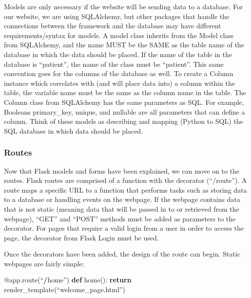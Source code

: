 \documentclass[]{book}
\newenvironment{Shaded}{\begin{snugshade}}{\end{snugshade}}
\newcommand{\KeywordTok}[1]{\textcolor[rgb]{0.13,0.29,0.53}{\textbf{#1}}}
\newcommand{\ControlFlowTok}[1]{\textcolor[rgb]{0.13,0.29,0.53}{\textbf{#1}}}
\newcommand{\OperatorTok}[1]{\textcolor[rgb]{0.81,0.36,0.00}{\textbf{#1}}}
\newcommand{\AttributeTok}[1]{\textcolor[rgb]{0.77,0.63,0.00}{#1}}
\newcommand{\NormalTok}[1]{#1}
\begin{document}
Models are only necessary if the website will be sending data to a
database. For our website, we are using SQLAlchemy, but other packages
that handle the connections between the framework and the database may
have different requirements/syntax for models. A model class inherits
from the Model class from SQLAlchemy, and the name MUST be the SAME as
the table name of the database in which the data should be placed. If
the name of the table in the database is ``patient'', the name of the
class must be ``patient''. This same convention goes for the columns of
the database as well. To create a Column instance which correlates with
(and will place data into) a column within the table, the variable name
must be the same as the column name in the table. The Column class from
SQLAlchemy has the same parameters as SQL. For example, Booleans
primary\_key, unique, and nullable are all parameters that can define a
column. Think of these models as describing and mapping (Python to SQL)
the SQL database in which data should be placed.

\subsubsection{Routes}\label{routes}

Now that Flask models and forms have been explained, we can move on to
the routes. Flask routes are comprised of a function with the decorator
\citet{app.route}(``/route''). A route maps a specific URL to a function
that performs tasks such as storing data to a database or handling
events on the webpage. If the webpage contains data that is not static
(meaning data that will be passed in to or retrieved from the webpage),
``GET'' and ``POST'' methods must be added as parameters to the
decorator. For pages that require a valid login from a user in order to
access the page, the decorator \citet{login_required} from Flask Login
must be used.

Once the decorators have been added, the design of the route can begin.
Static webpages are fairly simple:

\begin{Shaded}
\begin{Highlighting}[]
\AttributeTok{@app.route}\NormalTok{(“}\OperatorTok{/}\NormalTok{home”)}
\KeywordTok{def}\NormalTok{ home():}
\ControlFlowTok{return}\NormalTok{ render_template(“welcome_page.html”)}
\end{Highlighting}
\end{Shaded}
\end{document}

